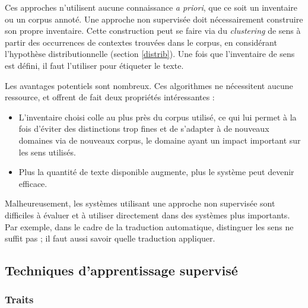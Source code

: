 Ces approches n'utilisent aucune connaissance \textit{a priori}, que ce soit un
inventaire ou un corpus annoté. Une approche non supervisée doit nécessairement
construire son propre inventaire. Cette construction peut se faire via du
\textit{clustering} de sens à partir des occurrences de contextes trouvées dans
le corpus, en considérant l'hypothèse distributionnelle (section
\ref{distrib}). Une fois que l'inventaire de sens est défini, il faut
l'utiliser pour étiqueter le texte.

Les avantages potentiels sont nombreux. Ces algorithmes ne nécessitent aucune
ressource, et offrent de fait deux propriétés intéressantes :

\begin{itemize}

    \item L'inventaire choisi colle au plus près du corpus utilisé, ce qui lui
        permet à la fois d'éviter des distinctions trop fines et de s'adapter à
        de nouveaux domaines via de nouveaux corpus, le domaine ayant un impact
        important sur les sens utilisés.

    \item Plus la quantité de texte disponible augmente, plus le système peut
        devenir efficace.

\end{itemize}

Malheureusement, les systèmes utilisant une approche non supervisée sont
difficiles à évaluer et à utiliser directement dans des systèmes plus
importants. Par exemple, dans le cadre de la traduction automatique, distinguer
les sens ne suffit pas ; il faut aussi savoir quelle traduction appliquer.

\subsection{Techniques d'apprentissage supervisé}

\subsubsection{Traits}


